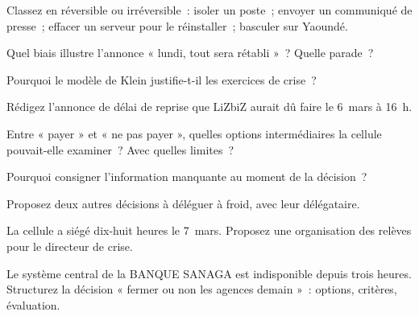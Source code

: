 \bigskip

\begin{boxexo}[title={\ding{45}\quad Exercice~23.1. Réversible \niveaubase}]
Classez en réversible ou irréversible~: isoler un poste~; envoyer un
communiqué de presse~; effacer un serveur pour le réinstaller~; basculer
sur Yaoundé.
\end{boxexo}

\begin{boxexo}[title={\ding{45}\quad Exercice~23.2. Les biais \niveaubase}]
Quel biais illustre l'annonce « lundi, tout sera rétabli »~? Quelle parade~?
\end{boxexo}

\begin{boxexo}[title={\ding{45}\quad Exercice~23.3. Klein \niveaubase}]
Pourquoi le modèle de Klein justifie-t-il les exercices de crise~?
\end{boxexo}

\begin{boxexo}[title={\ding{45}\quad Exercice~23.4. Une fourchette \niveaumoyen}]
Rédigez l'annonce de délai de reprise que LiZbiZ aurait dû faire le
6~mars à 16~h.
\end{boxexo}

\begin{boxexo}[title={\ding{45}\quad Exercice~23.5. Options intermédiaires \niveaumoyen}]
Entre « payer » et « ne pas payer », quelles options intermédiaires la
cellule pouvait-elle examiner~? Avec quelles limites~?
\end{boxexo}

\begin{boxexo}[title={\ding{45}\quad Exercice~23.6. Consigner \niveaumoyen}]
Pourquoi consigner l'information manquante au moment de la décision~?
\end{boxexo}

\begin{boxexo}[title={\ding{45}\quad Exercice~23.7. Délégations \niveaumoyen}]
Proposez deux autres décisions à déléguer à froid, avec leur délégataire.
\end{boxexo}

\begin{boxexo}[title={\ding{45}\quad Exercice~23.8. La fatigue \niveaumoyen}]
La cellule a siégé dix-huit heures le 7~mars. Proposez une organisation
des relèves pour le directeur de crise.
\end{boxexo}

\begin{boxexo}[title={\ding{45}\quad Exercice~23.9. Une décision bancaire \niveauexpert}]
Le système central de la BANQUE SANAGA est indisponible depuis trois
heures. Structurez la décision « fermer ou non les agences demain »~:
options, critères, évaluation.
\end{boxexo}


